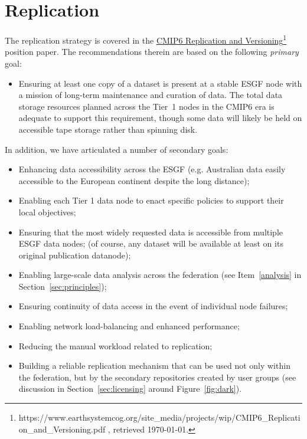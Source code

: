 \documentclass[gmd,manuscript]{copernicus}
\begin{document}
\section{Replication}
\label{sec:replica}

The replication strategy is covered in the
\href{https://www.earthsystemcog.org/site_media/projects/wip/CMIP6_Replication_and_Versioning.pdf
}{CMIP6 Replication and
  Versioning}\footnote{https://www.earthsystemcog.org/site\_media/projects/wip/CMIP6\_Replication\_and\_Versioning.pdf
  , retrieved \today.} position paper. The recommendations therein are
based on the following \emph{primary} goal:

\begin{itemize}
\item Ensuring at least one copy of a dataset is present at a stable
  ESGF node with a mission of long-term maintenance and curation of
  data. The total data storage resources planned across the Tier~1
  nodes in the CMIP6 era is adequate to support this requirement,
  though some data will likely be held on accessible tape storage
  rather than spinning disk.
\end{itemize}

In addition, we have articulated a number of secondary goals:

\begin{itemize}
\item Enhancing data accessibility across the ESGF (e.g. Australian
  data easily accessible to the European continent despite the long
  distance);
\item Enabling each Tier 1 data node to enact specific policies to
  support their local objectives;
\item Ensuring that the most widely requested data is accessible from
  multiple ESGF data nodes; (of course, any dataset will be available
  at least on its original publication datanode);
\item Enabling large-scale data analysis across the federation (see
  Item~\ref{analysis} in Section~\ref{sec:principles});
\item Ensuring continuity of data access in the event of individual
  node failures;
\item Enabling network load-balancing and enhanced performance;
\item Reducing the manual workload related to replication;
\item Building a reliable replication mechanism that can be used not
  only within the federation, but by the secondary repositories
  created by user groups (see discussion in
  Section~\ref{sec:licensing} around Figure~\ref{fig:dark}).
\end{itemize}
\end{document}
